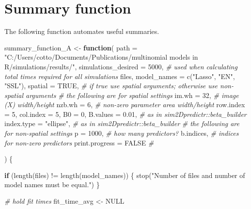 \documentclass[
]{article}
\newenvironment{Shaded}{\begin{snugshade}}{\end{snugshade}}
\newcommand{\AttributeTok}[1]{\textcolor[rgb]{0.77,0.63,0.00}{#1}}
\newcommand{\CommentTok}[1]{\textcolor[rgb]{0.56,0.35,0.01}{\textit{#1}}}
\newcommand{\ConstantTok}[1]{\textcolor[rgb]{0.00,0.00,0.00}{#1}}
\newcommand{\ControlFlowTok}[1]{\textcolor[rgb]{0.13,0.29,0.53}{\textbf{#1}}}
\newcommand{\DecValTok}[1]{\textcolor[rgb]{0.00,0.00,0.81}{#1}}
\newcommand{\FloatTok}[1]{\textcolor[rgb]{0.00,0.00,0.81}{#1}}
\newcommand{\FunctionTok}[1]{\textcolor[rgb]{0.00,0.00,0.00}{#1}}
\newcommand{\NormalTok}[1]{#1}
\newcommand{\OtherTok}[1]{\textcolor[rgb]{0.56,0.35,0.01}{#1}}
\newcommand{\SpecialCharTok}[1]{\textcolor[rgb]{0.00,0.00,0.00}{#1}}
\newcommand{\StringTok}[1]{\textcolor[rgb]{0.31,0.60,0.02}{#1}}
\begin{document}
\hypertarget{summary-function}{%
\section{Summary function}\label{summary-function}}

The following function automates useful summaries.

\begin{Shaded}
\begin{Highlighting}[]
\NormalTok{summary\_function\_A }\OtherTok{\textless{}{-}} \ControlFlowTok{function}\NormalTok{(}
  \AttributeTok{path =} \StringTok{"C:/Users/cotto/Documents/Publications/multinomial models in R/simulations/results/"}\NormalTok{,}
  \AttributeTok{simulations\_desired =} \DecValTok{5000}\NormalTok{, }\CommentTok{\# used when calculating total times required for all simulations}
\NormalTok{  files,}
  \AttributeTok{model\_names =} \FunctionTok{c}\NormalTok{(}\StringTok{"Lasso"}\NormalTok{, }\StringTok{"EN"}\NormalTok{, }\StringTok{"SSL"}\NormalTok{),}
  \AttributeTok{spatial =} \ConstantTok{TRUE}\NormalTok{, }\CommentTok{\# if true use spatial arguments; otherwise use non{-}spatial arguments}
  \CommentTok{\# the following are for spatial settings}
  \AttributeTok{im.wh =} \DecValTok{32}\NormalTok{, }\CommentTok{\# image (X) width/height }
  \AttributeTok{nzb.wh =} \DecValTok{6}\NormalTok{, }\CommentTok{\# non{-}zero parameter area width/height}
  \AttributeTok{row.index =} \DecValTok{5}\NormalTok{, }\AttributeTok{col.index =} \DecValTok{5}\NormalTok{, }\AttributeTok{B0 =} \DecValTok{0}\NormalTok{, }\AttributeTok{B.values =} \FloatTok{0.01}\NormalTok{, }\CommentTok{\# as in sim2Dpredictr::beta\_builder}
  \AttributeTok{index.type =} \StringTok{"ellipse"}\NormalTok{,  }\CommentTok{\# as in sim2Dpredictr::beta\_builder}
  \CommentTok{\# the following are for non{-}spatial settings}
  \AttributeTok{p =} \DecValTok{1000}\NormalTok{, }\CommentTok{\# how many predictors?}
\NormalTok{  b.indices, }\CommentTok{\# indices for non{-}zero predictors}
  \AttributeTok{print.progress =} \ConstantTok{FALSE} \CommentTok{\# }
  
  
\NormalTok{) \{}
  
  \ControlFlowTok{if}\NormalTok{ (}\FunctionTok{length}\NormalTok{(files) }\SpecialCharTok{!=} \FunctionTok{length}\NormalTok{(model\_names)) \{}
    \FunctionTok{stop}\NormalTok{(}\StringTok{"Number of files and number of model names must be equal."}\NormalTok{)}
\NormalTok{  \}}
  
  \CommentTok{\# hold fit times}
\NormalTok{  fit\_time\_avg }\OtherTok{\textless{}{-}} \ConstantTok{NULL}
  

\end{Highlighting}
\end{Shaded}
\end{document}
